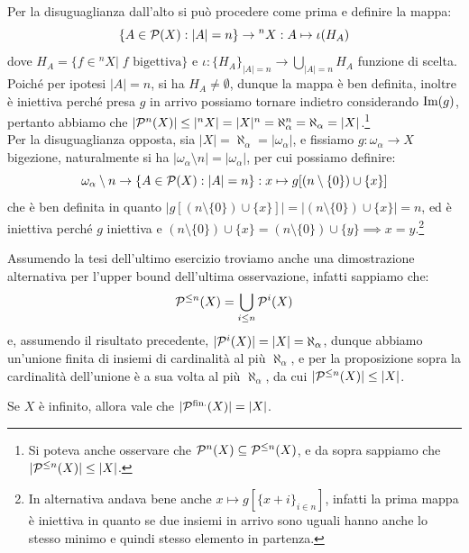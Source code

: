 \begin{soln}
	Per la disuguaglianza dall'alto si pu\`o procedere come prima e definire la mappa:
	\[ \{A \in \mathcal{P}(X) : |A| = n\} \to {}^n X : A \mapsto \iota(H_A)
		\]
	dove $H_A = \{f \in {}^n X | \; \text{$f$ bigettiva}\}$ e $\iota : \{H_A\}_{|A| = n} \to \bigcup_{|A| = n} H_A$ funzione di scelta. Poich\'e per ipotesi $|A| = n$, si ha $H_A \ne \emptyset$, dunque la mappa \`e ben definita, inoltre \`e iniettiva perch\'e presa $g$ in arrivo
	possiamo tornare indietro considerando $\operatorname{Im}(g)$, pertanto abbiamo che $|\mathcal{P}^n(X)| \leq |{}^n X| = |X|^n = \aleph_\alpha^n = \aleph_\alpha = |X|$.\footnote{Si poteva anche osservare che $\mathcal{P}^n(X) \subseteq \mathcal{P}^{\leq n}(X)$, e da sopra sappiamo che $|\mathcal{P}^{\leq n}(X)| \leq |X|$.}\\
	Per la disuguaglianza opposta, sia $|X| = \aleph_\alpha = |\omega_\alpha|$, e fissiamo $g : \omega_\alpha \to X$ bigezione, naturalmente si ha $|\omega_\alpha \setminus n| = |\omega_\alpha|$, per cui possiamo definire:
	\[ \omega_\alpha \setminus n \to \{A \in \mathcal{P}(X) : |A| = n\} : x \mapsto g[(n \setminus \{0\}) \cup \{x\}]
		\]
	che \`e ben definita in quanto $|g[(n \setminus \{0\}) \cup \{x\}]| = |(n \setminus \{0\}) \cup \{x\}| = n$, ed \`e iniettiva perch\'e $g$ iniettiva e $(n \setminus \{0\}) \cup \{x\} = (n \setminus \{0\}) \cup \{y\} \implies x = y$.\footnote{In alternativa andava bene anche $x \mapsto g[\{x + i\}_{i \in n}]$, infatti la prima mappa \`e iniettiva in quanto se due 
	insiemi in arrivo sono uguali hanno anche lo stesso minimo e quindi stesso elemento in partenza.}
\end{soln}

\begin{remark}
	Assumendo la tesi dell'ultimo esercizio troviamo anche una dimostrazione alternativa per l'upper bound dell'ultima osservazione, infatti sappiamo che:
	\[ \mathcal{P}^{\leq n}(X) = \bigcup_{i \leq n}\mathcal{P}^i(X)
		\]
	e, assumendo il risultato precedente, $|\mathcal{P}^i(X)| = |X| = \aleph_\alpha$, dunque abbiamo un'unione finita di insiemi di cardinalit\`a al pi\`u $\aleph_\alpha$, e per la proposizione sopra la cardinalit\`a dell'unione \`e a sua 
	volta al pi\`u $\aleph_\alpha$, da cui $|\mathcal{P}^{\leq n}(X)| \leq |X|$.
\end{remark}

\begin{proposition}[$|\psf(X)| = |X|$]
	\label{parti_finite_generale}
	Se $X$ \`e infinito, allora vale che $|\psf(X)| = |X|$.
\end{proposition}

